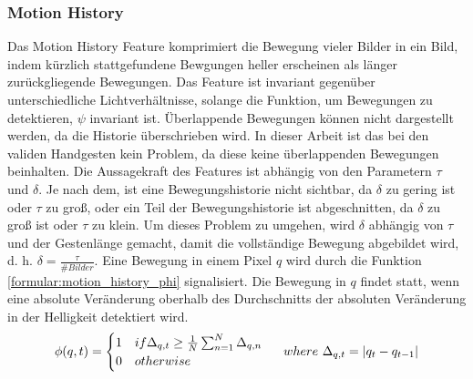 \subsubsection{Motion History}
Das Motion History Feature komprimiert die Bewegung vieler Bilder in ein Bild, indem kürzlich stattgefundene Bewgungen heller erscheinen als länger zurückgliegende Bewegungen. Das Feature ist invariant
gegenüber unterschiedliche Lichtverhältnisse, solange die Funktion, um Bewegungen zu detektieren, $\psi$ invariant ist. Überlappende Bewegungen können nicht dargestellt werden, da die Historie überschrieben
wird. In dieser Arbeit ist das bei den validen Handgesten kein Problem, da diese keine überlappenden Bewegungen beinhalten.
\newline
\newline
Die Aussagekraft des Features ist abhängig von den Parametern $\tau$ und $\delta$. Je nach dem, ist eine Bewegungshistorie nicht sichtbar, da $\delta$ zu gering ist oder $\tau$ zu groß, oder ein Teil der
Bewegungshistorie ist abgeschnitten, da $\delta$ zu groß ist oder $\tau$ zu klein. Um dieses Problem zu umgehen, wird $\delta$ abhängig von $\tau$ und der Gestenlänge gemacht, damit die vollständige
Bewegung abgebildet wird, d. h. $\delta = \frac{\tau}{\#Bilder}$.
\newline
\newline
Eine Bewegung in einem Pixel $q$ wird durch die Funktion \ref{formular:motion_history_phi} signalisiert. Die Bewegung in $q$ findet statt, wenn eine absolute Veränderung oberhalb des Durchschnitts der
absoluten Veränderung in der Helligkeit detektiert wird.
\begin{align}
    \phi(q,t) = \begin{cases}
                    1 & if \Delta_{q,t} \geq \frac{1}{N} \sum_{n=1}^N \Delta_{q,n} \\
                    0 & otherwise
    \end{cases}
    \hspace{0.5cm}where\ \Delta_{q,t} = |q_t - q_{t-1}|
    \label{formular:motion_history_phi}
\end{align}

